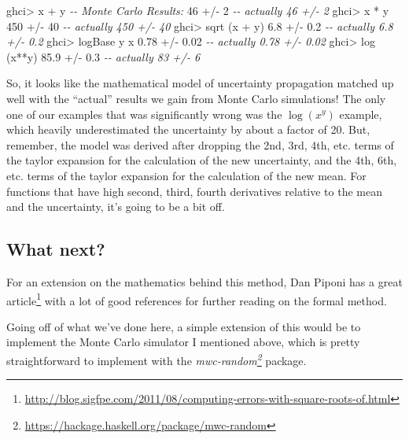 \documentclass[]{article}
\newenvironment{Shaded}{}{}
\newcommand{\CommentTok}[1]{\textcolor[rgb]{0.38,0.63,0.69}{\textit{#1}}}
\newcommand{\DecValTok}[1]{\textcolor[rgb]{0.25,0.63,0.44}{#1}}
\newcommand{\FloatTok}[1]{\textcolor[rgb]{0.25,0.63,0.44}{#1}}
\newcommand{\FunctionTok}[1]{\textcolor[rgb]{0.02,0.16,0.49}{#1}}
\newcommand{\NormalTok}[1]{#1}
\newcommand{\OperatorTok}[1]{\textcolor[rgb]{0.40,0.40,0.40}{#1}}
\renewcommand{\href}[2]{#2\footnote{\url{#1}}}
\begin{document}
\begin{Shaded}
\begin{Highlighting}[]
\NormalTok{ghci}\OperatorTok{\textgreater{}}\NormalTok{ x }\OperatorTok{+}\NormalTok{ y         }\CommentTok{{-}{-} Monte Carlo Results:}
\DecValTok{46} \OperatorTok{+/{-}} \DecValTok{2}            \CommentTok{{-}{-} actually 46 +/{-} 2}
\NormalTok{ghci}\OperatorTok{\textgreater{}}\NormalTok{ x }\OperatorTok{*}\NormalTok{ y}
\DecValTok{450} \OperatorTok{+/{-}} \DecValTok{40}          \CommentTok{{-}{-} actually 450 +/{-} 40}
\NormalTok{ghci}\OperatorTok{\textgreater{}} \FunctionTok{sqrt}\NormalTok{ (x }\OperatorTok{+}\NormalTok{ y)}
\FloatTok{6.8} \OperatorTok{+/{-}} \FloatTok{0.2}         \CommentTok{{-}{-} actually 6.8 +/{-} 0.2}
\NormalTok{ghci}\OperatorTok{\textgreater{}} \FunctionTok{logBase}\NormalTok{ y x}
\FloatTok{0.78} \OperatorTok{+/{-}} \FloatTok{0.02}       \CommentTok{{-}{-} actually 0.78 +/{-} 0.02}
\NormalTok{ghci}\OperatorTok{\textgreater{}} \FunctionTok{log}\NormalTok{ (x}\OperatorTok{**}\NormalTok{y)}
\FloatTok{85.9} \OperatorTok{+/{-}} \FloatTok{0.3}        \CommentTok{{-}{-} actually 83 +/{-} 6}
\end{Highlighting}
\end{Shaded}

So, it looks like the mathematical model of uncertainty propagation matched up
well with the ``actual'' results we gain from Monte Carlo simulations! The only
one of our examples that was significantly wrong was the
\(\operatorname{log}(x^y)\) example, which heavily underestimated the
uncertainty by about a factor of 20. But, remember, the model was derived after
dropping the 2nd, 3rd, 4th, etc. terms of the taylor expansion for the
calculation of the new uncertainty, and the 4th, 6th, etc. terms of the taylor
expansion for the calculation of the new mean. For functions that have high
second, third, fourth derivatives relative to the mean and the uncertainty, it's
going to be a bit off.

\subsection{What next?}\label{what-next}

For an extension on the mathematics behind this method, Dan Piponi has a
\href{http://blog.sigfpe.com/2011/08/computing-errors-with-square-roots-of.html}{great
article} with a lot of good references for further reading on the formal method.

Going off of what we've done here, a simple extension of this would be to
implement the Monte Carlo simulator I mentioned above, which is pretty
straightforward to implement with the
\emph{\href{https://hackage.haskell.org/package/mwc-random}{mwc-random}}
package.
\end{document}
